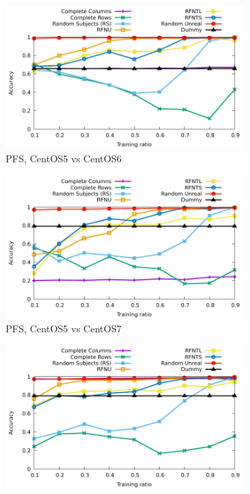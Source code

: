 \documentclass[10pt, conference, compsocconf]{IEEEtran}
\begin{document}
\begin{figure}
\begin{subfigure}[b]{\columnwidth}
        \includegraphics[width=0.8\columnwidth]{data/results/means_of_results/ALS/PreFreeSurfer/ALS-PFS-5v6.pdf}
        \caption{PFS, CentOS5 vs CentOS6}
\end{subfigure}
\begin{subfigure}[b]{\columnwidth}
        \includegraphics[width=0.8\columnwidth]{data/results/means_of_results/ALS/PreFreeSurfer/ALS-PFS-5v7.pdf}
        \caption{PFS, CentOS5 vs CentOS7}
\end{subfigure}
\begin{subfigure}[b]{\columnwidth}
        \includegraphics[width=0.8\columnwidth]{data/results/means_of_results/ALS/PreFreeSurfer/ALS-PFS-6v7.pdf}

\end{subfigure}
\end{figure}
\end{document}
